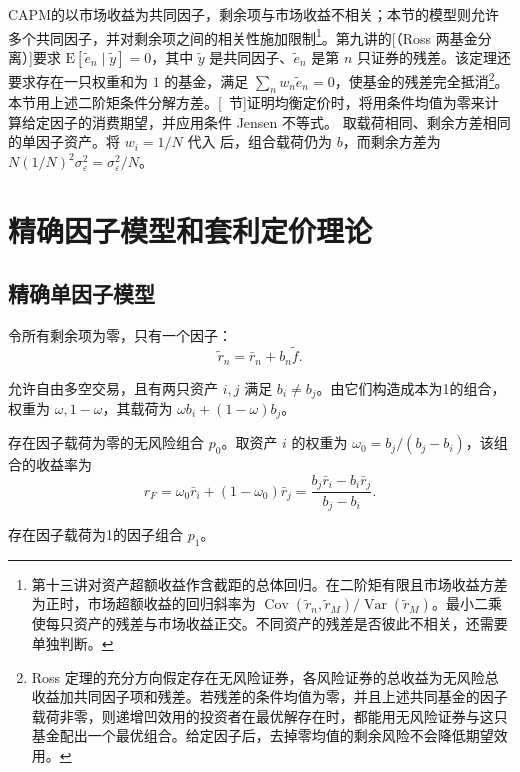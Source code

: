 CAPM的以市场收益为共同因子，剩余项与市场收益不相关；本节的模型则允许多个共同因子，并对剩余项之间的相关性施加限制\footnote{第十三讲对资产超额收益作含截距的总体回归。在二阶矩有限且市场收益方差为正时，市场超额收益的回归斜率为 $\operatorname{Cov}(\widetilde r_n,\widetilde r_M)/\operatorname{Var}(\widetilde r_M)$。最小二乘使每只资产的残差与市场收益正交。不同资产的残差是否彼此不相关，还需要单独判断。}。第九讲的[（Ross 两基金分离）]要求 $\mathrm E[\tilde e_n\mid\tilde y]=0$，其中 $\tilde y$ 是共同因子、$\tilde e_n$ 是第 $n$ 只证券的残差。该定理还要求存在一只权重和为 $1$ 的基金，满足 $\sum_n w_n\tilde e_n=0$，使基金的残差完全抵消\footnote{Ross 定理的充分方向假定存在无风险证券，各风险证券的总收益为无风险总收益加共同因子项和残差。若残差的条件均值为零，并且上述共同基金的因子载荷非零，则递增凹效用的投资者在最优解存在时，都能用无风险证券与这只基金配出一个最优组合。给定因子后，去掉零均值的剩余风险不会降低期望效用。}。本节用上述二阶矩条件分解方差。[~节]证明均衡定价时，将用条件均值为零来计算给定因子的消费期望，并应用条件 Jensen 不等式。
 取载荷相同、剩余方差相同的单因子资产。将 $w_i=1/N$ 代入 后，组合载荷仍为 $b$，而剩余方差为 $N(1/N)^2\sigma_\varepsilon^2=\sigma_\varepsilon^2/N$。


\section{精确因子模型和套利定价理论}\label{sec:wj-fourteen-2}
\subsection{精确单因子模型}
令所有剩余项为零，只有一个因子：
\begin{equation}
 \widetilde r_n=\bar r_n+b_n\widetilde f.\label{eq:wj-14-3}
\end{equation}

允许自由多空交易，且有两只资产 $i,j$ 满足 $b_i\ne b_j$。由它们构造成本为1的组合，权重为 $\omega,1-\omega$，其载荷为 $\omega b_i+(1-\omega)b_j$。
\begin{tcolorbox}[knowledge]
 存在因子载荷为零的无风险组合 $p_0$。取资产 $i$ 的权重为 $\omega_0=b_j/(b_j-b_i)$，该组合的收益率为
\begin{equation*}
 r_F=\omega_0\bar r_i+(1-\omega_0)\bar r_j
 =\frac{b_j\bar r_i-b_i\bar r_j}{b_j-b_i}.
 \tag{14.III}\label{eq:wj-14-zero-loading-return}
\end{equation*}

 存在因子载荷为1的因子组合 $p_1$。
\end{tcolorbox}

